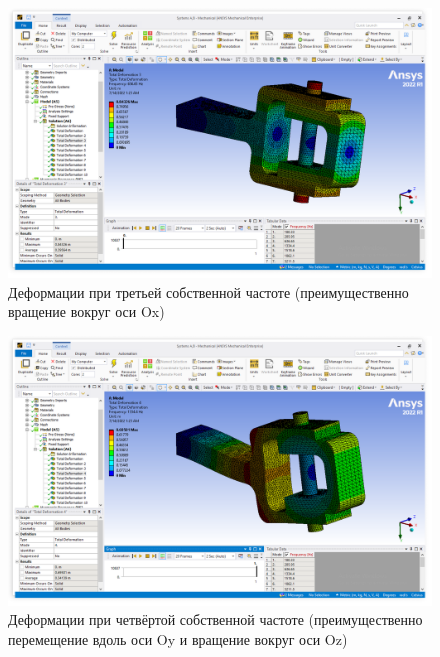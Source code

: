 \begin{figure}[H] 
	\center
	\includegraphics[width=\textwidth]{images/mod3.png}
	\caption{Деформации при третьей собственной частоте (преимущественно вращение вокруг оси Ox)}
	\label{fig:mod3}
\end{figure}

\begin{figure}[H] 
	\center
	\includegraphics[width=\textwidth]{images/mod4.png}
	\caption{Деформации при четвёртой собственной частоте (преимущественно перемещение вдоль оси Oy и вращение вокруг оси Oz)}
	\label{fig:mod4}
\end{figure}

